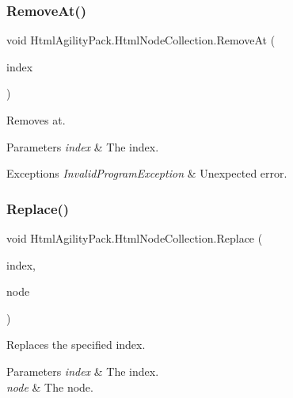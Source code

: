 \subsubsection{\texorpdfstring{Remove\+At()}{RemoveAt()}}
{\footnotesize\ttfamily void Html\+Agility\+Pack.\+Html\+Node\+Collection.\+Remove\+At (\begin{DoxyParamCaption}\item[{int}]{index }\end{DoxyParamCaption})\hspace{0.3cm}{\ttfamily [inline]}}



Removes at. 


\begin{DoxyParams}{Parameters}
{\em index} & The index.\\
\hline
\end{DoxyParams}

\begin{DoxyExceptions}{Exceptions}
{\em Invalid\+Program\+Exception} & Unexpected error.\\
\hline
\end{DoxyExceptions}
\mbox{\label{class_html_agility_pack_1_1_html_node_collection_ae1f50126a6ef764fef65077c61a50539}} 
\subsubsection{\texorpdfstring{Replace()}{Replace()}}
{\footnotesize\ttfamily void Html\+Agility\+Pack.\+Html\+Node\+Collection.\+Replace (\begin{DoxyParamCaption}\item[{int}]{index,  }\item[{\hyperlink{class_html_agility_pack_1_1_html_node}{Html\+Node}}]{node }\end{DoxyParamCaption})\hspace{0.3cm}{\ttfamily [inline]}}



Replaces the specified index. 


\begin{DoxyParams}{Parameters}
{\em index} & The index.\\
\hline
{\em node} & The node.\\
\hline
\end{DoxyParams}

